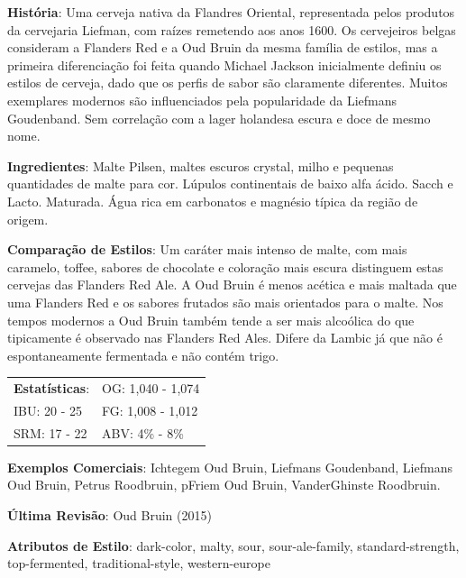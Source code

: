 \textbf{História}: Uma cerveja nativa da Flandres Oriental, representada pelos produtos da cervejaria Liefman, com raízes remetendo aos anos 1600. Os cervejeiros belgas consideram a Flanders Red e a Oud Bruin da mesma família de estilos, mas a primeira diferenciação foi feita quando Michael Jackson inicialmente definiu os estilos de cerveja, dado que os perfis de sabor são claramente diferentes. Muitos exemplares modernos são influenciados pela popularidade da Liefmans Goudenband. Sem correlação com a lager holandesa escura e doce de mesmo nome.

\textbf{Ingredientes}: Malte Pilsen, maltes escuros crystal, milho e pequenas quantidades de malte para cor. Lúpulos continentais de baixo alfa ácido. Sacch e Lacto. Maturada. Água rica em carbonatos e magnésio típica da região de origem.

\textbf{Comparação de Estilos}: Um caráter mais intenso de malte, com mais caramelo, toffee, sabores de chocolate e coloração mais escura distinguem estas cervejas das Flanders Red Ale. A Oud Bruin é menos acética e mais maltada que uma Flanders Red e os sabores frutados são mais orientados para o malte. Nos tempos modernos a Oud Bruin também tende a ser mais alcoólica do que tipicamente é observado nas Flanders Red Ales. Difere da Lambic já que não é espontaneamente fermentada e não contém trigo.

\begin{tabular}{@{}p{35mm}p{35mm}@{}}
  \textbf{Estatísticas}: & OG: 1,040 - 1,074 \\
  IBU: 20 - 25  & FG: 1,008 - 1,012  \\
  SRM: 17 - 22  & ABV: 4\% - 8\%
\end{tabular}

\textbf{Exemplos Comerciais}: Ichtegem Oud Bruin, Liefmans Goudenband, Liefmans Oud Bruin, Petrus Roodbruin, pFriem Oud Bruin, VanderGhinste Roodbruin.

\textbf{Última Revisão}: Oud Bruin (2015)

\textbf{Atributos de Estilo}: dark-color, malty, sour, sour-ale-family, standard-strength, top-fermented, traditional-style, western-europe
